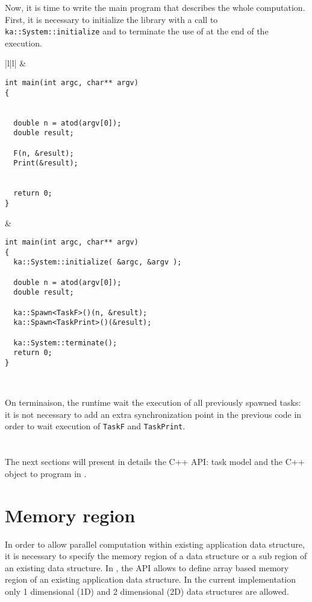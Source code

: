 Now, it is time to write the main program that describes the whole computation. First, it is necessary to initialize the \kaapi library with a call to \verb+ka::System::initialize+ and to terminate the use of \kaapi at the end of the execution.
\begin{center}
\begin{tabular}{|l|l|}
\hline
{} &
 \\\hline
\rule{0mm}{3mm}%
\begin{minipage}[t]{75mm}
\begin{verbatim}
int main(int argc, char** argv)
{


  double n = atod(argv[0]);
  double result;
  
  F(n, &result);
  Print(&result);
  
  
  return 0;
}
\end{verbatim}
\end{minipage}%
\rule[-13mm]{0mm}{10mm}
&
\begin{minipage}[t]{88mm}
\begin{verbatim}
int main(int argc, char** argv)
{
  ka::System::initialize( &argc, &argv );

  double n = atod(argv[0]);
  double result;
  
  ka::Spawn<TaskF>()(n, &result);
  ka::Spawn<TaskPrint>()(&result);

  ka::System::terminate();
  return 0;
}
\end{verbatim}
\end{minipage}
\\\hline
\end{tabular}
\label{fig:task_creation}
\end{center}
On terminaison, the \kaapi runtime wait the execution of all previously spawned tasks: it is not necessary to add an extra synchronization point in the previous code in order to wait execution of \verb+TaskF+ and \verb+TaskPrint+.
~\\
~\\
~\\

The next sections will present in details the C++ API: task model and the C++ object to program in \kaapi.


\newpage
\section{Memory region}\label{sec:memory}
In order to allow parallel computation within existing application data structure, it is necessary to specify the memory region of a data structure or a sub region of an existing data structure.
In \kaapi, the API allows to define array based memory region of an existing application data structure.
In the current implementation only 1 dimensional (1D) and 2 dimensional (2D) data structures are allowed.

